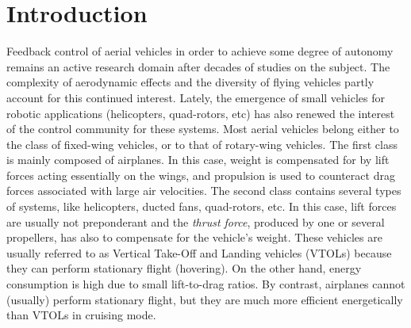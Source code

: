 \documentclass[twocolumn]{autart}
\theoremstyle{definition}
\theoremstyle{definition}
\begin{document}
\section{Introduction}
Feedback
control of aerial vehicles in order to achieve some degree of autonomy remains an active
research domain after decades of studies on the subject. The complexity of aerodynamic effects and the diversity of
flying vehicles partly account for this continued interest. Lately, the  emergence of small vehicles for robotic applications
(helicopters, quad-rotors, etc) has also renewed the interest of the control community for these systems.
Most aerial vehicles belong either to the class of fixed-wing vehicles,
or to that of rotary-wing vehicles.
The first class is mainly composed of airplanes. In this case, weight is compensated for by lift forces
acting essentially on the wings, and propulsion is used to counteract drag forces associated with large
air velocities. The second class contains several types of systems, like helicopters,
ducted fans, quad-rotors, etc. In this case, lift forces are usually not preponderant and the \emph{thrust force}, produced by one or several propellers, has also to compensate for the vehicle's weight. These vehicles are usually referred to as Vertical Take-Off
and Landing vehicles (VTOLs) because they can perform stationary flight (hovering). On the other hand, energy consumption
is high due to small lift-to-drag ratios. By contrast, airplanes cannot (usually) perform stationary flight,
but they are much more efficient energetically than VTOLs in cruising mode.
\end{document}
